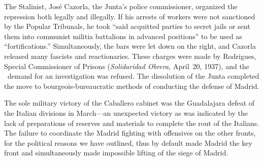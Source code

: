 \indexCNT
The Stalinist, José Cazorla, the Junta’s police commissioner, organized the repression both legally and illegally. If his arrests of workers were not sanctioned by the Popular Tribunals, he took ``said acquitted parties to secret jails or sent them into communist militia battalions in advanced positions'' to be used as ``fortifications.'' Simultaneously, the bars were let down on the right, and Cazorla released many fascists and reactionaries. These charges were made by Rodrigues, Special Commissioner of Prisons (\emph{Solidaridad Obrera,} April~20, 1937), and the \CNT\ demand for an investigation was refused. The dissolution of the Junta completed the move to bourgeois-bureaucratic methods of conducting the defense of Madrid.

\indexLCaballero{}
The sole military victory of the Caballero cabinet was the Guadalajara defeat of the Italian divisions in March---an unexpected victory as was indicated by the lack of preparations of reserves and materials to complete the rout of the Italians. The failure to coordinate the Madrid fighting with offensives on the other fronts, for the political reasons we have outlined, thus by default made Madrid the key front and simultaneously made impossible lifting of the siege of Madrid.